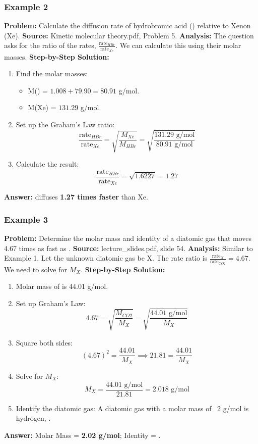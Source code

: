 \documentclass{article}
\begin{document}
\subsubsection{Example 2}
\textbf{Problem:} Calculate the diffusion rate of hydrobromic acid () relative to Xenon (Xe).
\textbf{Source:} Kinetic molecular theory.pdf, Problem 5.
\textbf{Analysis:} The question asks for the ratio of the rates, $\frac{\text{rate}_{HBr}}{\text{rate}_{Xe}}$. We can calculate this using their molar masses.
\textbf{Step-by-Step Solution:}
\begin{enumerate}
    \item Find the molar masses:
    \begin{itemize}
        \item M() = $1.008 + 79.90 = 80.91$ g/mol.
        \item M(Xe) = $131.29$ g/mol.
    \end{itemize}
    \item Set up the Graham's Law ratio:
    \[ \frac{\text{rate}_{HBr}}{\text{rate}_{Xe}} = \sqrt{\frac{M_{Xe}}{M_{HBr}}} = \sqrt{\frac{131.29 \text{ g/mol}}{80.91 \text{ g/mol}}} \]
    \item Calculate the result:
    \[ \frac{\text{rate}_{HBr}}{\text{rate}_{Xe}} = \sqrt{1.6227} = 1.27 \]
\end{enumerate}
\textbf{Answer:}  diffuses \textbf{1.27 times faster} than Xe.

\subsubsection{Example 3}
\textbf{Problem:} Determine the molar mass and identity of a diatomic gas that moves 4.67 times as fast as .
\textbf{Source:} lecture\_slides.pdf, slide 54.
\textbf{Analysis:} Similar to Example 1. Let the unknown diatomic gas be X. The rate ratio is $\frac{\text{rate}_X}{\text{rate}_{CO2}} = 4.67$. We need to solve for $M_X$.
\textbf{Step-by-Step Solution:}
\begin{enumerate}
    \item Molar mass of  is 44.01 g/mol.
    \item Set up Graham's Law:
    \[ 4.67 = \sqrt{\frac{M_{CO2}}{M_X}} = \sqrt{\frac{44.01 \text{ g/mol}}{M_X}} \]
    \item Square both sides:
    \[ (4.67)^2 = \frac{44.01}{M_X} \implies 21.81 = \frac{44.01}{M_X} \]
    \item Solve for $M_X$:
    \[ M_X = \frac{44.01 \text{ g/mol}}{21.81} = 2.018 \text{ g/mol} \]
    \item Identify the diatomic gas: A diatomic gas with a molar mass of ~2 g/mol is hydrogen, .
\end{enumerate}
\textbf{Answer:} Molar Mass = \textbf{2.02 g/mol}; Identity = \textbf{}.
\end{document}
